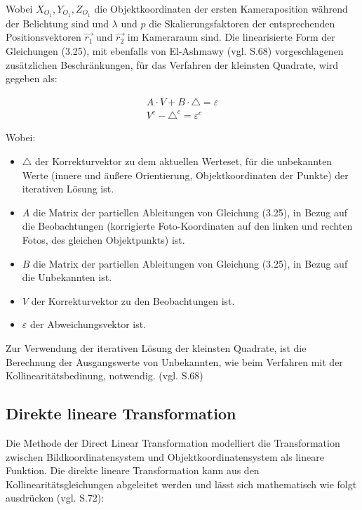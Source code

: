 Wobei $X_{O_1}, Y_{O_1},Z_{O_1}$ die Objektkoordinaten der ersten Kameraposition während der Belichtung sind und $\lambda$ und $p$ die Skalierungsfaktoren der entsprechenden Positionsvektoren $\vec{r_1}$ und $\vec{r_2}$ im Kameraraum sind. 
Die linearisierte Form der Gleichungen (3.25), mit ebenfalls von El-Ashmawy (vgl. \cite{comparative_conditions_study} S.68) vorgeschlagenen zusätzlichen Beschränkungen, für das Verfahren der kleinsten Quadrate, wird gegeben als:

\begin{equation}
\begin{aligned}
A\cdot V + B\cdot \triangle = \varepsilon \\
V^c - \triangle^c = \varepsilon^c
\end{aligned}
\end{equation}

Wobei:
\begin{itemize}
\item $\triangle$ der Korrekturvektor zu dem aktuellen Werteset, für die unbekannten Werte (innere und äußere Orientierung, Objektkoordinaten der Punkte) der iterativen Lösung ist.

\item $A$ die Matrix der partiellen Ableitungen von Gleichung (3.25), in Bezug auf die Beobachtungen (korrigierte Foto-Koordinaten auf den linken und rechten Fotos, des gleichen Objektpunkts) ist.

\item $B$ die Matrix der partiellen Ableitungen von Gleichung (3.25), in Bezug auf die Unbekannten  ist.

\item $V$ der Korrekturvektor zu den Beobachtungen ist.

\item $\varepsilon$ der Abweichungsvektor ist.
\end{itemize}

Zur Verwendung der iterativen Lösung der kleinsten Quadrate, ist die Berechnung der Ausgangswerte von Unbekannten, wie beim Verfahren mit der Kollinearitätsbedinung, notwendig. (vgl. \cite{comparative_conditions_study} S.68)


\subsection{Direkte lineare Transformation}

Die Methode der \glqq Direct Linear Transformation\grqq{} modelliert die Transformation zwischen Bildkoordinatensystem und Objektkoordinatensystem als lineare Funktion. Die direkte lineare Transformation kann aus den Kollinearitätsgleichungen abgeleitet werden und lässt sich mathematisch wie folgt ausdrücken (vgl. \cite{dlt} S.72):

